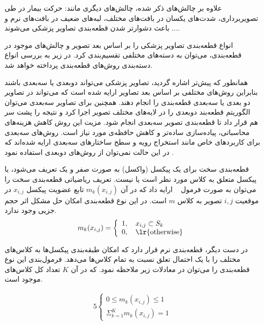 علاوه بر چالش‌های ذکر شده، چالش‌های دیگری مانند: حرکت بیمار در طی تصویربرداری، شدت‌های یکسان در بافت‌های مختلف، لبه‌های ضعیف در بافت‌های نرم و ... باعث دشوارتر شدن قطعه‌بندی تصاویر پزشکی می‌شوند.


انواع قطعه‌بندی تصاویر پزشکی را بر اساس بعد تصویر و چالش‌های موجود در قطعه‌بندی، می‌توان به دسته‌های مختلفی تقسیم‌بندی کرد. در زیر به بررسی انواع دسته‌بندی روش‌های قطعه‌بندی پرداخته خواهد شد.

همانطور که پیش‌تر اشاره گردید، تصاویر پزشکی می‌تواند دوبعدی یا سه‌بعدی باشند بنابراین روش‌های مختلفی بر اساس بعد تصاویر ارایه شده است که می‌تواند در تصاویر دو بعدی یا سه‌بعدی قطعه‌بندی را انجام دهند. همچنین برای تصاویر سه‌بعدی می‌توان الگوریتم قطعه‌بند دوبعدی را در لایه‌های مختلف تصویر اجرا کرد و نتیجه را پشت سر هم قرار داد تا قطعه‌بندی تصویر سه‌بعدی انجام شود. مزیت این روش کاهش هزینه‌های محاسباتی، پیاده‌سازی ساده‌تر و کاهش حافظه‌ی مورد نیاز است. روش‌های سه‌بعدی برای کاربردهای خاص مانند استخراج رویه و سطح ساختارهای سه‌بعدی ارایه شده‌اند که در این حالت نمی‌توان از روش‌های دوبعدی استفاده نمود .
 
قطعه‌بندی سخت برای یک پیکسل (واکسل) به صورت صفر و یک تعریف می‌شود، یا پیکسل متعلق به کلاس مورد نظر است یا نیست. تعریف ریاضیاتی قطعه‌بندی سخت را می‌توان به صورت فرمول ~ ارایه داد که در آن $m_{k}(x_{i,j})$ تابع عضویت پیکسل $x_{i,j}$ در موقعیت $i,j$ تصویر به کلاس $m$ است. در این نوع قطعه‌بندی امکان حل مشکل اثر حجم جزیی وجود ندارد.
\begin{alignat}{5}
	m_{k}(x_{i,j})= \left\{ %
	\begin{array}{l} %
		1, \quad x_{i,j} \subset S_{k}   \label{hard_seg} \\
		0, \quad \text{\lr{otherwise}}
	\end{array}
 \right. %
\end{alignat}

در دست دیگر، قطعه‌بندی نرم قرار دارد که امکان طبقه‌بندی پیکسل‌ها به کلاس‌های مختلف را با یک احتمال تعلق نسبت به تمام کلاس‌ها می‌دهد. فرمول‌بندی این نوع قطعه‌بندی را می‌توان در معادلات زیر ملاحظه نمود. که در آن $K$ تعداد کل کلاس‌های موجود است.

\begin{alignat}{5}
	\left\{
	\begin{array}{l}
	0 \leq m_{k}(x_{i,j}) \leq 1      \\
	\Sigma_{k = 1}^{K} m_{k}(x_{i,j}) = 1  \label{soft_seg}
	\end{array}
	\right. %
\end{alignat}

